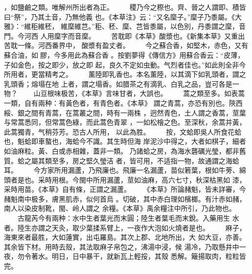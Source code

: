 \documentclass{ctexart}
\begin{document}
，如鹽鹼之類。唯解州所出者為正。 　　稷乃今之穄也。齊、晉之人謂即、積皆曰``祭''，乃其土音，乃無他義 也。《本草注》云：``又名穈子。''穈子乃黍屬。《大雅》：``維秬維秠， 維穈維芑。''秬、秠、穈、芑皆黍屬，以色別，丹黍謂之穈，音門。今河西 人用穈字而音穈。 　　苦耽即《本草》酸漿也。《新集本草》又重出苦耽一條。河西番界中， 酸漿有盈丈者。 　　今之蘇合香，如堅木，赤色，又有蘇合油，如膠，今多用此為蘇合香 。按劉夢得《傳信方》用蘇合香云：``皮薄，子如金色，按之即少，放之即 起，良久不定如虫動。气烈者佳也。''如此則全非今所用者，更當精考之。 　　薰陸即乳香也。本名薰陸，以其滴下如乳頭者，謂之乳頭香；熔塌在地 上者，謂之塌香。如腊茶之有滴乳、白乳之品，豈可各是一物？ 　　山豆根味极苦，《本草》言味甘者，大誤也。 　　蒿之類至多。如表蒿一類，自有兩种：有黃色者，有青色者。《本草》 謂之青蒿，亦恐有別也。陝西綏、銀之間有青蒿，在蒿叢之間，時有一兩株 ，迥然青色，土人謂之香蒿，莖葉与常蒿悉同，但常蒿色綠，而此蒿色青翠 ，一如松檜之色。至深秋，余蒿并黃，此蒿獨青，气稍芬芳。恐古人所用， 以此為胜。 　　按，文蛤即吳人所食花蛤也，魁蛤即車螯也，海蛤今不識。其生時但海 岸泥沙中得之，大者如棋子，細者如油麻粒。黃、白或赤相雜，蓋非一類。 乃諸蛤之房，為海水礱礪光瑩，都非舊質。蛤之屬其類至多，房之堅久瑩洁 者，皆可用，不适指一物，故通謂之海蛤耳。 　　今方家所用漏蘆，乃飛廉也。飛廉一名漏蘆，苗似箬葉，根如牛蒡、綿 頭者是也。采時用根。今閩中所用漏蘆，莖如油麻，高六七寸，秋深枯黑如 漆，采時用苗。《本草》自有條，正謂之漏蘆。 　　《本草》所論赭魁，皆未詳審，今赭魁南中极多，膚黑肌赤，似何首烏 。切破，其中赤白理如檳榔。有汁赤如赭，南人以染皮制靴，閩、岭人謂之 余糧。《本草》禹余糧注中所引，乃此物也。 　　古龍芮今有兩种：水中生者葉光而末圓；陸生者葉毛而末銳。入藥用生 水者。陸生亦謂之天灸，取少葉揉系臂上，一夜作大泡如火燒者是也。 　　麻子，海東來者最胜，大如蓮實，出屯羅島。其次上郡、北地所出，大 如大豆，亦善。其余皆下材。用時去殼，其法取麻子帛包之，沸湯中浸，候 湯冷，乃取懸井中一夜，勿令著水。明日，日中暴干，就新瓦上輕挼，其殼 悉解。簸揚取肉，粒粒皆完。
\end{document}

